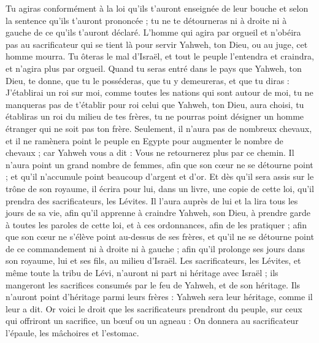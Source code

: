 \begin{multicols}{2}
Tu agiras conformément à la loi qu'ils t'auront enseignée de leur bouche et selon la sentence qu'ils t'auront prononcée ; tu ne te détourneras ni à droite ni à gauche de ce qu'ils t'auront déclaré.
L'homme qui agira par orgueil et n'obéira pas au sacrificateur qui se tient là pour servir Yahweh, ton Dieu, ou au juge, cet homme mourra. Tu ôteras le mal d'Israël,
et tout le peuple l'entendra et craindra, et n'agira plus par orgueil.
Quand tu seras entré dans le pays que Yahweh, ton Dieu, te donne, que tu le posséderas, que tu y demeureras, et que tu diras : J'établirai un roi sur moi, comme toutes les nations qui sont autour de moi,
tu ne manqueras pas de t'établir pour roi celui que Yahweh, ton Dieu, aura choisi, tu établiras un roi du milieu de tes frères, tu ne pourras point désigner un homme étranger qui ne soit pas ton frère.
Seulement, il n'aura pas de nombreux chevaux, et il ne ramènera point le peuple en Egypte pour augmenter le nombre de chevaux ; car Yahweh vous a dit : Vous ne retournerez plus par ce chemin.
Il n'aura point un grand nombre de femmes, afin que son cœur ne se détourne point ; et qu'il n'accumule point beaucoup d'argent et d'or.
Et dès qu'il sera assis sur le trône de son royaume, il écrira pour lui, dans un livre, une copie de cette loi, qu'il prendra des sacrificateurs, les Lévites.
Il l'aura auprès de lui et la lira tous les jours de sa vie, afin qu'il apprenne à craindre Yahweh, son Dieu, à prendre garde à toutes les paroles de cette loi, et à ces ordonnances, afin de les pratiquer ;
afin que son cœur ne s'élève point au-dessus de ses frères, et qu'il ne se détourne point de ce commandement ni à droite ni à gauche ; afin qu'il prolonge ses jours dans son royaume, lui et ses fils, au milieu d'Israël.
\VerseOne{}Les sacrificateurs, les Lévites, et même toute la tribu de Lévi, n'auront ni part ni héritage avec Israël ; ils mangeront les sacrifices consumés par le feu de Yahweh, et de son héritage.
Ils n'auront point d'héritage parmi leurs frères : Yahweh sera leur héritage, comme il leur a dit.
Or voici le droit que les sacrificateurs prendront du peuple, sur ceux qui offriront un sacrifice, un bœuf ou un agneau : On donnera au sacrificateur l'épaule, les mâchoires et l'estomac.

\end{multicols}
